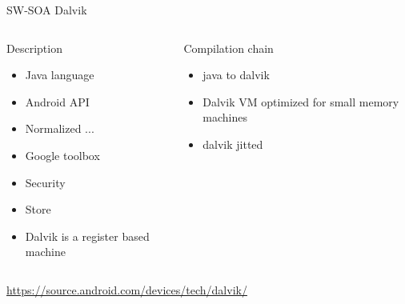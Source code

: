 %
\begin{Frame}{SW-SOA Dalvik}
  \begin{columns}[t]
    \begin{column}{\BW} %
      \begin{block}{Description}
        \begin{itemize}
        \item Java language
        \item Android API
        \item Normalized ...
        \item Google toolbox
        \item Security
        \item Store
        \item Dalvik is a register based machine
        \end{itemize}
      \end{block} 
    \end{column}
    
    \begin{column}{\BW} %
      \begin{block}{Compilation chain}
        \begin{itemize}
        \item java to dalvik
        \item Dalvik VM optimized for small memory machines
        \item dalvik jitted
        \end{itemize}
      \end{block}   
    \end{column}
  \end{columns}  
\url{https://source.android.com/devices/tech/dalvik/}
\end{Frame}


